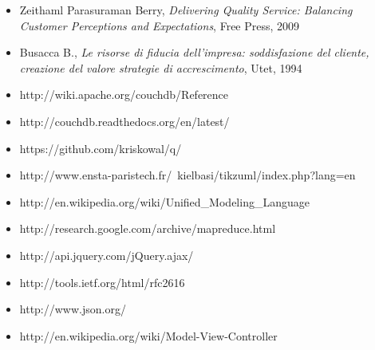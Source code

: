 \begin{itemize}
  \item Zeithaml Parasuraman Berry, \emph{Delivering Quality Service: Balancing
  Customer Perceptions and Expectations}, Free Press, 2009
  \item Busacca B., \emph{Le risorse di fiducia dell’impresa: soddisfazione del
  cliente, creazione del valore strategie di accrescimento}, Utet, 1994
  \item http://wiki.apache.org/couchdb/Reference
  \item http://couchdb.readthedocs.org/en/latest/
  \item https://github.com/kriskowal/q/
  \item http://www.ensta-paristech.fr/~kielbasi/tikzuml/index.php?lang=en
  \item http://en.wikipedia.org/wiki/Unified\_Modeling\_Language
  \item http://research.google.com/archive/mapreduce.html
  \item http://api.jquery.com/jQuery.ajax/
  \item http://tools.ietf.org/html/rfc2616
  \item http://www.json.org/
  \item http://en.wikipedia.org/wiki/Model-View-Controller
\end{itemize}